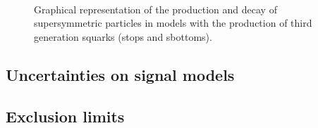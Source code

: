 \begin{figure}[h!]
  \begin{center}
     ~~
    \caption{
      Graphical representation of the production and decay of supersymmetric particles 
      in models with the production of third generation squarks (stops and sbottoms). 
    }
    \label{fig:simplified-models-feyn-3rdGen}
  \end{center}
\end{figure}




\subsection{Uncertainties on signal models}


\subsection{Exclusion limits}


